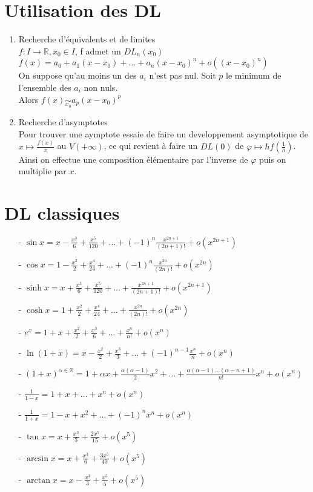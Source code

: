 \documentclass[fleqn]{article}
\theoremstyle{definition} \newtheorem*{defi}{D\'efinition}
\theoremstyle{definition} \newtheorem*{theo}{Th\'eor\`eme}
\theoremstyle{definition} \newtheorem*{prop}{Propri\'et\'e}
\theoremstyle{definition} \newtheorem*{coro}{Corollaire}
\theoremstyle{remark} \newtheorem*{rqs}{Remarques}
\begin{document}
\section{Utilisation des DL}
\begin{enumerate}
	\item Recherche d'\'equivalents et de limites \\
		$f: I \rightarrow \mathbb{R}, x_0 \in I$, f admet un $DL_n(x_0)$ \\
		$f(x) =  a_0 + a_1(x-x_0) + \hdots + a_n(x-x_0)^n + o((x-x_0)^n)$ \\
		On suppose qu'au moins un des $a_i$ n'est pas nul. Soit $p$ le minimum de l'ensemble des $a_i$ non nuls. \\
		Alors $f(x) \underset{x_0}{\sim} a_p(x-x_0)^p$
	\item Recherche d'asymptotes \\
		Pour trouver une aymptote essaie de faire un developpement asymptotique de $x \mapsto \frac{f(x)}{x}$ au $V(+\infty)$, ce qui revient
		\`a faire un $DL(0)$ de $\varphi \mapsto h f(\frac{1}{h})$. \\
		Ainsi on effectue une composition \'el\'ementaire par l'inverse de $\varphi$ puis on multiplie par $x$.
\end{enumerate}

\section{DL classiques}
\begin{itemize}
	\item [-] $\sin x = x - \frac{x^3}{6} + \frac{x^5}{120} + \hdots + (-1)^n \frac{x^{2n+1}}{(2n+1)!} + o(x^{2n+1})$
	\item [-] $\cos x = 1 - \frac{x^2}{2} + \frac{x^4}{24} + \hdots + (-1)^n \frac{x^{2n}}{(2n)!} + o(x^{2n})$
	\item [-] $\sinh x = x + \frac{x^3}{6} + \frac{x^5}{120} + \hdots + \frac{x^{2n+1}}{(2n+1)!} + o(x^{2n+1})$
	\item [-] $\cosh x = 1 + \frac{x^2}{2} + \frac{x^4}{24} + \hdots + \frac{x^{2n}}{(2n)!} + o(x^{2n})$
	\item [-] $e^x = 1 + x + \frac{x^2}{2} + \frac{x^3}{6} + \hdots + \frac{x^n}{n!} + o(x^n)$
	\item [-] $\ln(1+x) = x - \frac{x^2}{2} + \frac{x^3}{3} + \hdots + (-1)^{n-1} \frac{x^n}{n} + o(x^n)$
	\item [-] $(1+x)^{\alpha \in \mathbb{R}} = 1 + \alpha x + \frac{\alpha(\alpha -1)}{2} x^2 + \hdots + \frac{\alpha(\alpha-1)\hdots
		(\alpha-n+1)}{n!} x^n + o(x^n)$
	\item [-] $\frac{1}{1-x} = 1 + x + \hdots + x^n + o(x^n)$
	\item [-] $\frac{1}{1+x} = 1 - x + x^2 + \hdots + (-1)^n x^n + o(x^n)$
	\item [-] $\tan x = x + \frac{x^3}{3} + \frac{2x^5}{15} + o(x^5)$
	\item [-] $\arcsin x = x + \frac{x^3}{6} + \frac{3x^5}{40} + o(x^5)$
	\item [-] $\arctan x = x - \frac{x^3}{3} + \frac{x^5}{5} + o(x^5)$
\end{itemize}
\end{document}
